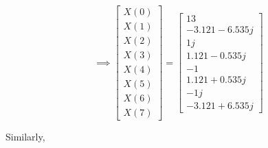 \documentclass[journal,12pt,twocolumn]{IEEEtran}
\renewcommand\thesection{\arabic{section}}
\begin{document}
\begin{enumerate}[label=\thesection.\arabic*.,ref=\thesection.\theenumi]
\begin{equation}
\implies
\begin{bmatrix}
X(0) \\
X(1) \\
X(2) \\
X(3) \\
X(4) \\
X(5) \\
X(6) \\
X(7)
\end{bmatrix}
=
\begin{bmatrix}
13 \\
-3.121 - 6.535j \\
1j \\
1.121 - 0.535j \\
-1 \\
1.121 + 0.535j \\
-1j \\
-3.121 + 6.535j
\end{bmatrix}
\end{equation}

Similarly,



\end{enumerate}
\end{document}
